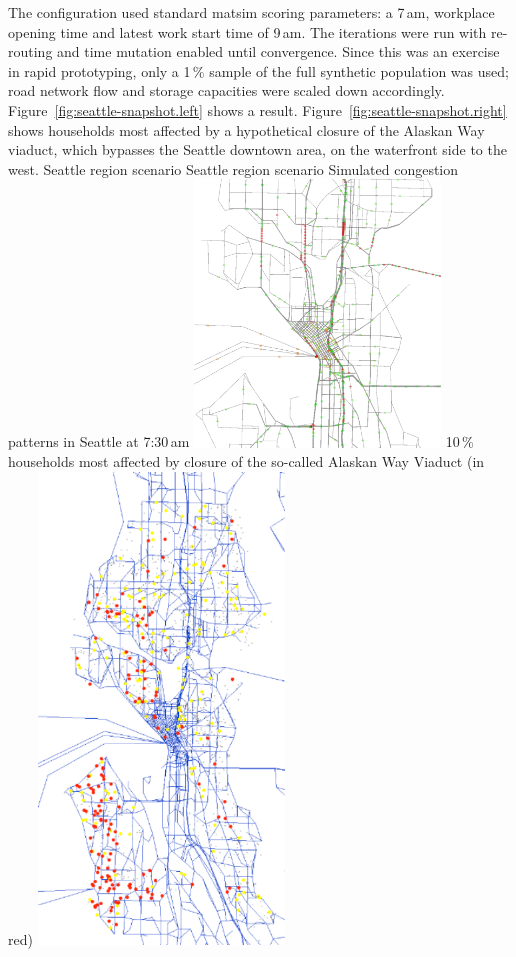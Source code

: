 The configuration used standard \gls{matsim} scoring parameters: a 7\,am, workplace opening time and latest work start time of 9\,am. The iterations were run with re-routing and time mutation enabled until convergence. Since this was an exercise in rapid prototyping, only a 1\,\% sample of the full synthetic population was used; road network flow and storage capacities were scaled down accordingly. Figure~\ref{fig:seattle-snapshot.left} shows a result. Figure~\ref{fig:seattle-snapshot.right} shows households most affected by a hypothetical closure of the Alaskan Way viaduct, which bypasses the Seattle downtown area, on the waterfront side to the west.
%
\createfigure%
{Seattle region scenario}%
{Seattle region scenario}%
{\label{fig:seattle-snapshot}}%
{%
  \createsubfigure%
  {Simulated congestion patterns in Seattle at 7:30\,am}%
  {\includegraphics[width=0.49\textwidth,angle=0]{scenarios/figures/seattle-snapshot-7h30.pdf}}%
  {\label{fig:seattle-snapshot.left}}%
  {}%
  \createsubfigure%
  {10\,\% households most affected by closure of the so-called Alaskan Way Viaduct (in red)}%
	{\includegraphics[width=0.49\textwidth,angle=0]{scenarios/figures/seattle-top-10pct-0it.pdf}}%
  {\label{fig:seattle-snapshot.right}}%
  {}%
}%
{}



